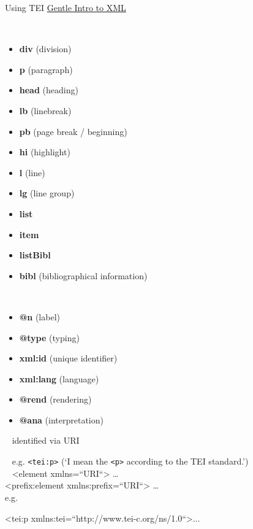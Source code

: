 \begin{frame}{Using TEI}
\footnotesize
\href{http://www.tei-c.org/release/doc/tei-p5-doc/en/html/SG.html}{Gentle Intro to XML}

\begin{multicols}{2}
~ 
\begin{itemize}
    \item \textbf{div} (division) \item \textbf{p} (paragraph) \item \textbf{head} (heading) \item \textbf{lb} (linebreak) \item \textbf{pb} (page break / beginning) \item \textbf{hi} (highlight) \item \textbf{l} (line) \item \textbf{lg} (line group) \item \textbf{list} \item \textbf{item} \item \textbf{listBibl} \item \textbf{bibl} (bibliographical information)
\end{itemize}

~ 
\begin{itemize}
    \item \textbf{@n} (label) \item \textbf{@type} (typing) \item \textbf{xml:id} (unique identifier) \item \textbf{xml:lang} (language) \item \textbf{@rend} (rendering) \item \textbf{@ana} (interpretation)
\end{itemize}
\end{multicols}


\framebreak

~ identified via URI 

~
e.g. \texttt{<tei:p>} (`I mean the \texttt{<p>} according to the TEI standard.') \\

~ <element xmlns=“URI“> \dots \\
<prefix:element xmlns:prefix=“URI“> \dots \\
e.g. 
\begin{xmlcode}
<tei:p xmlns:tei=“http://www.tei-c.org/ns/1.0“>...
\end{xmlcode}


\end{frame}
